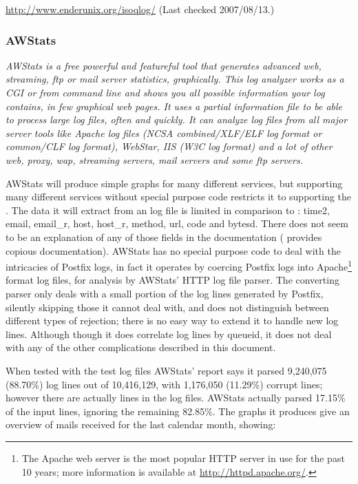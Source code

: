 \url{http://www.enderunix.org/isoqlog/} \newline (Last checked 2007/08/13.)

\subsubsection{AWStats}

\textit{AWStats is a free powerful and featureful tool that generates
advanced web, streaming, ftp or mail server statistics, graphically. This
log analyzer works as a CGI or from command line and shows you all possible
information your log contains, in few graphical web pages. It uses a
partial information file to be able to process large log files, often and
quickly. It can analyze log files from all major server tools like Apache
log files (NCSA combined/XLF/ELF log format or common/CLF log format),
WebStar, IIS (W3C log format) and a lot of other web, proxy, wap, streaming
servers, mail servers and some ftp servers.\/}

AWStats will produce simple graphs for many different services, but
supporting many different services without special purpose code restricts
it to supporting the \LCD{}.  The data it will extract from an \MTA{} log
file is limited in comparison to \parsername{}: \newline \tab{} time2,
email, email\_r, host, host\_r, method, url, code and bytesd.\newline
There does not seem to be an explanation of any of those fields in the
documentation (\parsername{} provides copious documentation).  AWStats has
no special purpose code to deal with the intricacies of Postfix logs, in
fact it operates by coercing Postfix logs into Apache\footnote{The Apache
web server is the most popular HTTP server in use for the past 10 years;
more information is available at \url{http://httpd.apache.org/}.} format
log files, for analysis by AWStats' HTTP log file parser.  The converting
parser only deals with a small portion of the log lines generated by
Postfix, silently skipping those it cannot deal with, and does not
distinguish between different types of rejection; there is no easy way to
extend it to handle new log lines.  Although though it does correlate log
lines by queueid, it does not deal with any of the other complications
described in this document.

When tested with the \numberOFlogFILES{} test log files AWStats' report
says it parsed 9,240,075 (88.70\%) log lines out of 10,416,129, with
1,176,050 (11.29\%) corrupt lines; however there are actually
\numberOFlogLINES{} lines in the \numberOFlogFILES{} log files.  AWStats
actually parsed 17.15\% of the input lines, ignoring the remaining 82.85\%.
The graphs it produces give an overview of mails received for the last
calendar month, showing:

